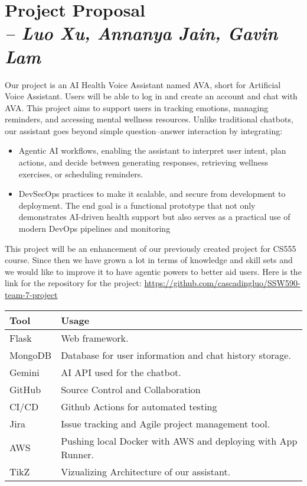 \chapter{Project Proposal \\
\small{\textit{-- Luo Xu, Annanya Jain, Gavin Lam}}
\label{Chapter::Project Proposal}}

Our project is an AI Health Voice Assistant named AVA, short for Artificial Voice Assistant. Users will be able to log in and create an account and chat with AVA. This project aims to support users in tracking emotions, managing reminders, and accessing mental wellness resources. Unlike traditional chatbots, our assistant goes beyond simple question–answer interaction by integrating:

\begin{itemize}
\item Agentic AI workflows, enabling the assistant to interpret user intent, plan actions, and decide between generating responses, retrieving wellness exercises, or scheduling reminders.

\item DevSecOps practices to make it scalable, and secure from development to deployment.
The end goal is a functional prototype that not only demonstrates AI-driven health support but also serves as a practical use of modern DevOps pipelines and monitoring
\end{itemize} 
This project will be an enhancement of our previously created project for CS555 course. Since then we have grown a lot in terms of knowledge and skill sets and we would like to improve it to have agentic powers 
to better aid users. Here is the link for the repository for the project: 
\url{https://github.com/cascadingluo/SSW590-team-7-project}

\begin{longtable}{|p{4cm}|p{10cm}|}
\hline
\textbf{Tool} & \textbf{Usage} \\ \hline
Flask & Web framework. \\ \hline
MongoDB & Database for user information and chat history storage. \\ \hline
Gemini & AI API used for the chatbot. \\ \hline
GitHub & Source Control and Collaboration \\ \hline
CI/CD & Github Actions for automated testing\\ \hline
Jira & Issue tracking and Agile project management tool. \\ \hline
AWS & Pushing local Docker with AWS and deploying with App Runner. \\ \hline
TikZ & Vizualizing Architecture of our assistant. \\ \hline 
\end{longtable}
